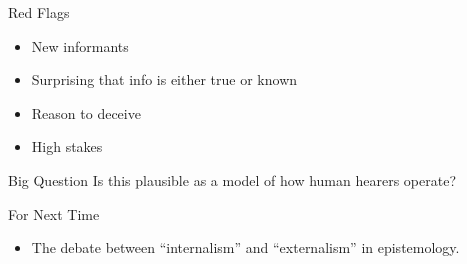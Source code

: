 \documentclass[
  17pt,
  letterpaper,
  ignorenonframetext,
  aspectratio=169,
]{beamer}
\providecommand{\tightlist}{%
  \setlength{\itemsep}{0pt}\setlength{\parskip}{0pt}}\usepackage{longtable,booktabs,array}
\begin{document}
\begin{frame}{Red Flags}
\protect\hypertarget{red-flags}{}
\begin{itemize}[<+->]
\tightlist
\item
  New informants
\item
  Surprising that info is either true or known
\item
  Reason to deceive
\item
  High stakes
\end{itemize}
\end{frame}

\begin{frame}{Big Question}
\protect\hypertarget{big-question}{}
Is this plausible as a model of how human hearers operate?
\end{frame}

\begin{frame}{For Next Time}
\protect\hypertarget{for-next-time}{}
\begin{itemize}[<+->]
\tightlist
\item
  The debate between ``internalism'' and ``externalism'' in
  epistemology.
\end{itemize}
\end{frame}
\end{document}
